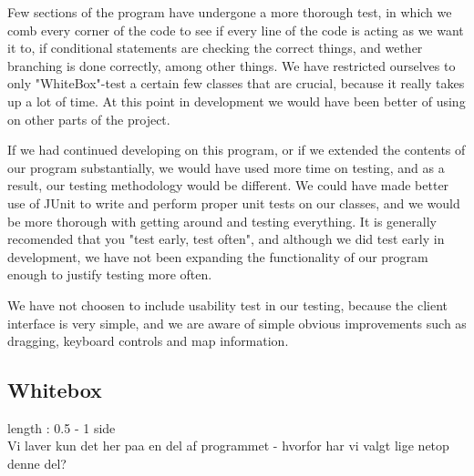\documentclass[a4paper,10pt,titlepage]{article}
\begin{document}
Few sections of the program have undergone a more thorough test, in which we comb every corner of the code to see if every line of the code is acting as we want it to, if conditional statements are checking the correct things, and wether branching is done correctly, among other things. We have restricted ourselves to only "WhiteBox"-test a certain few classes that are crucial, because it really takes up a lot of time. At this point in development we would have been better of using on other parts of the project.

If we had continued developing on this program, or if we extended the contents of our program substantially, we would have used more time on testing, and as a result, our testing methodology would be different. We could have made better use of JUnit to write and perform proper unit tests on our classes, and we would be more thorough with getting around and testing everything. It is generally recomended that you "test early, test often", and although we did test early in development, we have not been expanding the functionality of our program enough to justify testing more often. 

We have not choosen to include usability test in our testing, because the client interface is very simple, and we are aware of simple obvious improvements such as dragging, keyboard controls and map information.

	
		
		\subsection{Whitebox}
			length : 0.5 - 1 side\\
			
			Vi laver kun det her paa en del af programmet - hvorfor har vi valgt lige netop denne del?\\
			
\end{document}
